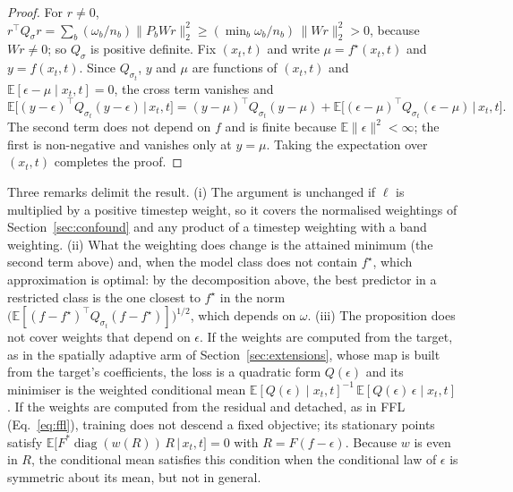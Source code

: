 \begin{proof}
For $r \neq 0$,
$r^\top Q_\sigma r = \sum_b (\omega_b/n_b)\lVert P_b W r\rVert_2^2
\ge (\min_b \omega_b/n_b)\,\lVert W r \rVert_2^2 > 0$, because $W r \neq 0$;
so $Q_\sigma$ is positive definite. Fix $(x_t, t)$ and write
$\mu = f^\star(x_t, t)$ and $y = f(x_t, t)$. Since $Q_{\sigma_t}$, $y$ and
$\mu$ are functions of $(x_t, t)$ and
$\mathbb{E}[\epsilon - \mu \mid x_t, t] = 0$, the cross term vanishes and
\begin{equation*}
  \mathbb{E}\big[(y-\epsilon)^\top Q_{\sigma_t} (y-\epsilon) \,\big|\, x_t, t\big]
  = (y-\mu)^\top Q_{\sigma_t} (y-\mu)
  + \mathbb{E}\big[(\epsilon-\mu)^\top Q_{\sigma_t} (\epsilon-\mu) \,\big|\, x_t, t\big].
\end{equation*}
The second term does not depend on $f$ and is finite because
$\mathbb{E}\lVert\epsilon\rVert^2 < \infty$; the first is non-negative and
vanishes only at $y = \mu$. Taking the expectation over $(x_t, t)$ completes
the proof.
\end{proof}

Three remarks delimit the result. (i) The argument is unchanged if $\ell$ is
multiplied by a positive timestep weight, so it covers the normalised
weightings of Section~\ref{sec:confound} and any product of a timestep
weighting with a band weighting. (ii) What the weighting does change is the
attained minimum (the second term above) and, when the model class does not
contain $f^\star$, which approximation is optimal: by the decomposition above,
the best predictor in a restricted class is the one closest to $f^\star$ in
the norm $\big(\mathbb{E}[(f - f^\star)^\top Q_{\sigma_t} (f - f^\star)]\big)^{1/2}$,
which depends on $\omega$. (iii) The proposition does not cover
weights that depend on $\epsilon$. If the weights are computed from the target,
as in the spatially adaptive arm of Section~\ref{sec:extensions}, whose map is
built from the target's coefficients, the loss is a quadratic form
$Q(\epsilon)$ and its minimiser is the weighted conditional mean
$\mathbb{E}[Q(\epsilon) \mid x_t, t]^{-1}\,\mathbb{E}[Q(\epsilon)\,\epsilon \mid x_t, t]$.
If the weights are computed from the residual and detached, as in FFL
(Eq.~\eqref{eq:ffl}), training does not descend a fixed objective; its
stationary points satisfy
$\mathbb{E}\big[F^{*}\operatorname{diag}(w(R))\,R \,\big|\, x_t, t\big] = 0$
with $R = F(f - \epsilon)$. Because $w$ is even in $R$, the conditional mean
satisfies this condition when the conditional law of $\epsilon$ is symmetric
about its mean, but not in general.

